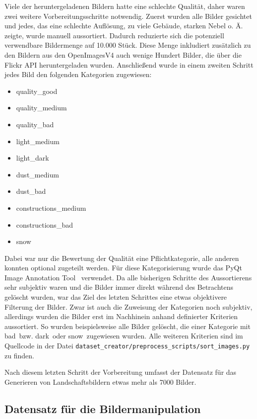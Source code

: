 Viele der heruntergeladenen Bildern hatte eine schlechte Qualität, daher waren
zwei weitere Vorbereitungsschritte notwendig. Zuerst wurden alle Bilder
gesichtet und jedes, das eine schlechte Auflösung, zu viele Gebäude, starken
Nebel o. Ä. zeigte, wurde manuell aussortiert. Dadurch reduzierte sich die
potenziell verwendbare Bildermenge auf 10.000 Stück. Diese Menge inkludiert
zusätzlich zu den Bildern aus den OpenImagesV4 auch wenige Hundert Bilder, die
über die Flickr API heruntergeladen wurden. Anschließend wurde in einem zweiten
Schritt jedes Bild den folgenden Kategorien zugewiesen:

\begin{itemize}
	\item quality\_good
	\item quality\_medium
	\item quality\_bad
	\item light\_medium
	\item light\_dark
	\item dust\_medium
	\item dust\_bad
	\item constructions\_medium
	\item constructions\_bad
	\item snow
\end{itemize}

Dabei war nur die Bewertung der Qualität eine Pflichtkategorie, alle anderen
konnten optional zugeteilt werden. Für diese Kategorisierung wurde das \glqq
PyQt Image Annotation Tool\grqq~\cite{brada2022} verwendet. Da alle bisherigen
Schritte des Aussortierens sehr subjektiv waren und die Bilder immer direkt
während des Betrachtens gelöscht wurden, war das Ziel des letzten Schrittes eine
etwas objektivere Filterung der Bilder. Zwar ist auch die Zuweisung der
Kategorien noch subjektiv, allerdings wurden die Bilder erst im Nachhinein
anhand definierter Kriterien aussortiert. So wurden beispielsweise alle Bilder
gelöscht, die einer Kategorie mit \glqq bad\grqq\ bzw. \glqq dark\grqq\ oder
\glqq snow\grqq\ zugewiesen wurden. Alle weiteren Kriterien sind im Quellcode in
der Datei \texttt{dataset\_creator/preprocess\_scripts/sort\_images.py} zu
finden.

Nach diesem letzten Schritt der Vorbereitung umfasst der Datensatz für das
Generieren von Landschaftsbildern etwas mehr als 7000 Bilder.

\subsection{Datensatz für die Bildermanipulation}

